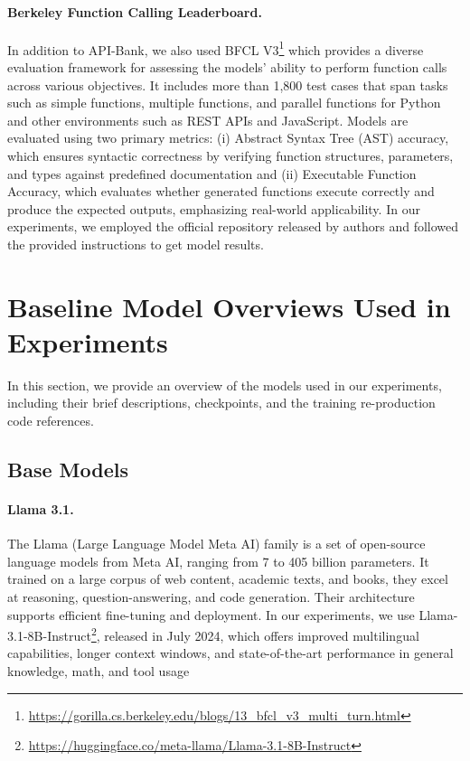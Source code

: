 \paragraph{Berkeley Function Calling Leaderboard.} In addition to API-Bank, we also used BFCL V3\footnote{\url{https://gorilla.cs.berkeley.edu/blogs/13_bfcl_v3_multi_turn.html}} \cite{patil2023gorilla} which provides a diverse evaluation framework for assessing the models' ability to perform function calls across various objectives. It includes more than 1,800 test cases that span tasks such as simple functions, multiple functions, and parallel functions for Python and other environments such as REST APIs and JavaScript. Models are evaluated using two primary metrics: (i) Abstract Syntax Tree (AST) accuracy, which ensures syntactic correctness by verifying function structures, parameters, and types against predefined documentation and (ii) Executable Function Accuracy, which evaluates whether generated functions execute correctly and produce the expected outputs, emphasizing real-world applicability. In our experiments, we employed the official repository released by authors and followed the provided instructions to get model results.



\section{Baseline Model Overviews Used in Experiments}
\label{app: model-overview} 
In this section, we provide an overview of the models used in our experiments, including their brief descriptions, checkpoints, and the training re-production code references.

\subsection{Base Models}

\paragraph{Llama 3.1.} The Llama (Large Language Model Meta AI) \cite{Dubey2024TheL3-llama3} family is a set of open-source language models from Meta AI, ranging from 7 to 405 billion parameters. It trained on a large corpus of web content, academic texts, and books, they excel at reasoning, question-answering, and code generation. Their architecture supports efficient fine-tuning and deployment. In our experiments, we use Llama-3.1-8B-Instruct\footnote{\url{https://huggingface.co/meta-llama/Llama-3.1-8B-Instruct}}, released in July 2024, which offers improved multilingual capabilities, longer context windows, and state-of-the-art performance in general knowledge, math, and tool usage

